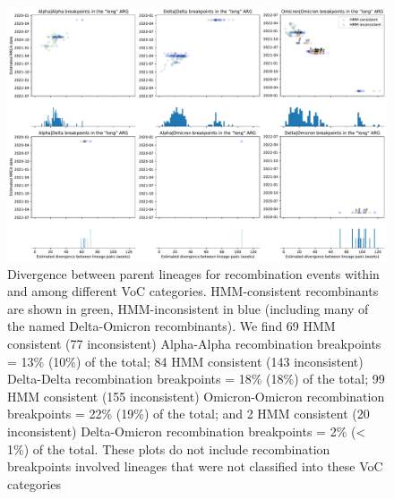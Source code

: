 \documentclass{article}
\begin{document}
\begin{figure} \centering
\includegraphics[width=\textwidth]{figures/supp_recombination_node_mrcas.pdf}
\caption{\label{fig:recomb_mrcas_voc_breakdown}  Divergence between parent lineages for recombination events within and among different VoC categories. HMM-consistent recombinants are shown in green, HMM-inconsistent in blue (including many of the named Delta-Omicron recombinants). We find 69 HMM consistent (77 inconsistent) Alpha-Alpha recombination breakpoints = 13\% (10\%) of the total; 84 HMM consistent (143 inconsistent) Delta-Delta recombination breakpoints = 18\% (18\%) of the total; 99 HMM consistent (155 inconsistent) Omicron-Omicron recombination breakpoints = 22\% (19\%) of the total; and 2 HMM consistent (20 inconsistent) Delta-Omicron recombination breakpoints = 2\% (< 1\%) of the total. These plots do not include recombination breakpoints involved lineages that were not classified into these VoC categories}
\end{figure}
\end{document}
